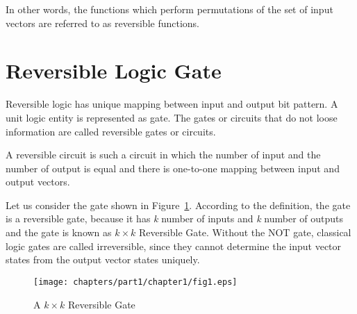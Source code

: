 In other words, the functions which perform permutations of the set of input vectors are referred to as reversible functions.

\section{Reversible Logic Gate}
Reversible logic has unique mapping between input and output bit pattern. A unit logic entity is represented as gate. The gates or circuits that do not loose information are called reversible gates or circuits.

\begin{property}\textnormal{
A reversible circuit is such a circuit in which the number of input and the number of output is equal and there is one-to-one mapping between input and output vectors.}
\end{property}
 
Let us consider the gate shown in Figure~\ref{fig:p1_c1_fig1}. According to the definition, the gate is a reversible gate, because it has \textit{k} number of inputs and \textit{k} number of outputs and the gate is known as $k \times k$ Reversible Gate. Without the NOT gate, classical logic gates are called irreversible, since they cannot determine the input vector states from the output vector states uniquely.
\begin{figure}[H]
	\centering
	\texttt{[image: chapters/part1/chapter1/fig1.eps]}
	\caption{A $k \times k$ Reversible Gate}
	\label{fig:p1_c1_fig1}
\end{figure}






